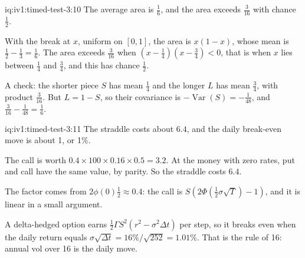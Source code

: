 \begin{solution}{iq:iv1:timed-test-3:10}
The average area is $\frac16$, and the area exceeds $\frac{3}{16}$ with chance $\frac12$.

With the break at $x$, uniform on $[0, 1]$, the area is $x(1 - x)$, whose mean is $\frac12 - \frac13 = \frac16$. The area exceeds $\frac{3}{16}$ when $(x - \frac14)(x - \frac34) < 0$, that is when $x$ lies between $\frac14$ and $\frac34$, and this has chance $\frac12$.

A check: the shorter piece $S$ has mean $\frac14$ and the longer $L$ has mean $\frac34$, with product $\frac{3}{16}$. But $L = 1 - S$, so their covariance is $-\operatorname{Var}(S) = -\frac{1}{48}$, and $\frac{3}{16} - \frac{1}{48} = \frac16$.


\end{solution}

\begin{solution}{iq:iv1:timed-test-3:11}
The straddle costs about $6.4$, and the daily break-even move is about 1, or 1\%.

The call is worth $0.4 \times 100 \times 0.16 \times 0.5 = 3.2$. At the money with zero rates, put and call have the same value, by parity. So the straddle costs $6.4$.

The factor comes from $2\phi(0)\frac12 \approx 0.4$: the call is $S(2\Phi(\frac12\sigma\sqrt{T}) - 1)$, and it is linear in a small argument.

A delta-hedged option earns $\frac12\Gamma S^2(r^2 - \sigma^2\Delta t)$ per step, so it breaks even when the daily return equals $\sigma\sqrt{\Delta t} = 16\%/\sqrt{252} = 1.01\%$. That is the rule of 16: annual vol over 16 is the daily move.


\end{solution}

